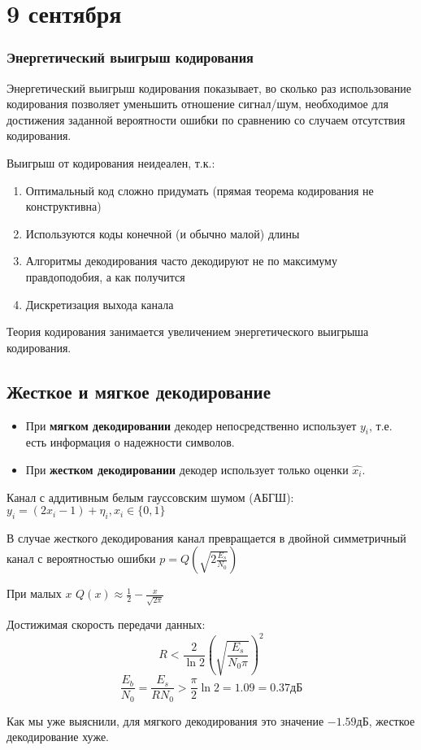 \chapter{9 сентября}

\subsection{Энергетический выигрыш кодирования}

Энергетический выигрыш кодирования показывает,
во сколько раз использование кодирования позволяет уменьшить отношение сигнал/шум,
необходимое для достижения заданной вероятности ошибки
по сравнению со случаем отсутствия кодирования.

Выигрыш от кодирования неидеален, т.к.:
\begin{enumerate}
	\item Оптимальный код сложно придумать (прямая теорема кодирования не конструктивна)
	\item Используются коды конечной (и обычно малой) длины
	\item Алгоритмы декодирования часто декодируют не по максимуму правдоподобия, а как получится
	\item Дискретизация выхода канала
\end{enumerate}

Теория кодирования занимается увеличением энергетического выигрыша кодирования.

\section{Жесткое и мягкое декодирование}

\begin{itemize}
	\item При \textbf{мягком декодировании} декодер непосредственно использует \(y_{i}\),
	      т.е. есть информация о надежности символов.
	\item При \textbf{жестком декодировании} декодер использует только оценки \(\hat{x_{i}}\).
\end{itemize}

\begin{example}
	Канал с аддитивным белым гауссовским шумом (АБГШ): \(y_{i} = (2x_{i} - 1) + \eta_i, x_{i} \in \{0, 1\}\)

	В случае жесткого декодирования канал превращается в двойной симметричный канал
    с вероятностью ошибки \(p = Q\left(\sqrt{2 \frac{E_s}{N_0}}\right)\)

    \begin{remark}
        При малых \(x\) \(Q(x) \approx \frac{1}{2} - \frac{x}{\sqrt{2\pi}}\)
    \end{remark}

    Достижимая скорость передачи данных:
    \[R < \frac{2}{\ln 2} \left(\sqrt{\frac{E_s}{N_0 \pi}}\right)^2\]
    \[\frac{E_b}{N_0} = \frac{E_s}{R N_0} > \frac{\pi}{2} \ln 2 = 1.09 = 0.37 \mathrm{дБ}\]

    Как мы уже выяснили, для мягкого декодирования это значение \( - 1.59 \mathrm{дБ}\), жесткое декодирование хуже.
\end{example}

